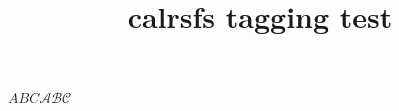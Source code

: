 \documentclass{article}
\title{calrsfs tagging test}
\begin{document}
$ABC\mathcal{ABC}$
\end{document}
